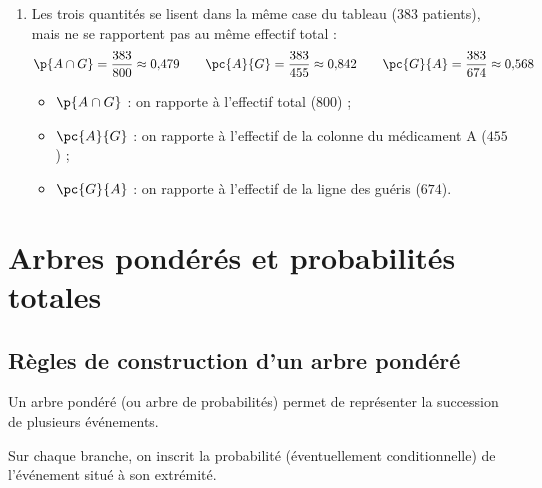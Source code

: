 \begin{methode}
\begin{correction}
\begin{enumerate}
			      La condition est $B$ : on se restreint à la colonne du médicament B ($345$ personnes), parmi lesquelles $291$ sont guéries.
			      \[
				      \pc{B}{G} = \dfrac{\card{B \cap G}}{\card{B}} = \dfrac{291}{345} \approx 0{,}843
			      \]
			\item Les trois quantités se lisent dans la même case du tableau ($383$ patients), mais ne se rapportent pas au même effectif total :
			      \[
				      \p{A \cap G} = \dfrac{383}{800} \approx 0{,}479 \qquad \pc{A}{G} = \dfrac{383}{455} \approx 0{,}842 \qquad \pc{G}{A} = \dfrac{383}{674} \approx 0{,}568
			      \]
			      \begin{itemize}
				      \item $\p{A \cap G}$ : on rapporte à l'effectif total ($800$) ;
				      \item $\pc{A}{G}$ : on rapporte à l'effectif de la colonne du médicament A ($455$) ;
				      \item $\pc{G}{A}$ : on rapporte à l'effectif de la ligne des guéris ($674$).
			      \end{itemize}
		\end{enumerate}
	\end{correction}
\end{methode}

\newpage

\section{Arbres pondérés et probabilités totales}

\subsection{Règles de construction d'un arbre pondéré}

Un arbre pondéré (ou arbre de probabilités) permet de représenter la succession de plusieurs événements.

Sur chaque branche, on inscrit la probabilité (éventuellement conditionnelle) de l'événement situé à son extrémité.

